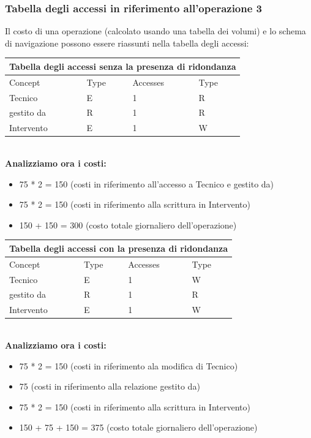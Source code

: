 \documentclass[legalpaper]{article}
\begin{document}
	\subsubsection{Tabella degli accessi in riferimento all'operazione 3}
	Il costo di una operazione (calcolato usando una tabella dei volumi) e lo schema di navigazione possono essere riassunti nella tabella degli accessi: \\ \newline
	\begin{tabular}{|p{4cm}|p{4cm}|p{4cm}|p{4cm}|}
		\hline
		\multicolumn{4}{|c|}{\textbf{Tabella degli accessi senza la presenza di ridondanza}}\\
		\hline
		Concept & Type & Accesses & Type \\
		\hline
		Tecnico & E & 1 & R \\
		\hline
		gestito da & R & 1 & R \\ 
		\hline
		Intervento & E & 1 & W \\
		\hline
	\end{tabular} \\
	\newline
	\textbf{Analizziamo ora i costi:}
	\begin{itemize}
		\item 75 * 2 = 150 (costi in riferimento all'accesso a Tecnico e gestito da)
		\item 75 * 2 = 150 (costi in riferimento alla scrittura in Intervento)
		\item 150 + 150 = 300 (costo totale giornaliero dell'operazione)
	\end{itemize}
	\begin{tabular}{|p{4cm}|p{4cm}|p{4cm}|p{4cm}|}
		\hline
		\multicolumn{4}{|c|}{\textbf{Tabella degli accessi con la presenza di ridondanza}}\\
		\hline
		Concept & Type & Accesses & Type \\
		\hline
		Tecnico & E & 1 & W \\
		\hline
		gestito da & R & 1 & R \\ 
		\hline
		Intervento & E & 1 & W \\
		\hline
	\end{tabular} \\
	\newline
	\textbf{Analizziamo ora i costi:}
	\begin{itemize}
		\item 75 * 2 = 150 (costi in riferimento ala modifica di Tecnico)
		\item 75 (costi in riferimento alla relazione gestito da)
		\item 75 * 2 = 150 (costi in riferimento alla scrittura in Intervento)
		\item 150 + 75 + 150 = 375 (costo totale giornaliero dell'operazione)
	\end{itemize}
	
\end{document}
